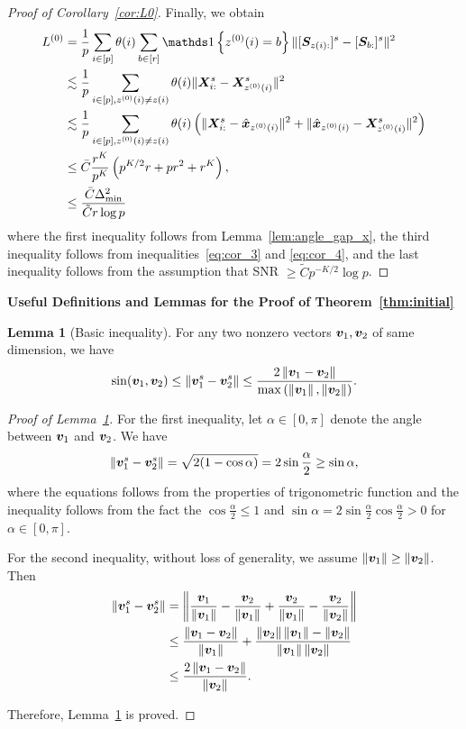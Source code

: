 \documentclass[lettersize,onecolumn,journal]{IEEEtran}
\theoremstyle{definition}
\newtheorem{lem}{Lemma}
\theoremstyle{definition}
\newcommand{\of}[1]{\left(#1\right)}
\newcommand{\offf}[1]{\left\{#1\right\}}
\begin{document}
\begin{proof} [Proof of Corollary~\ref{cor:L0}]
Finally, we obtain 
\begin{align}
     L^{(0)} &= \frac{1}{p}  \sum_{i \in [p]} \theta(i) \sum_{b \in [r]}  \ind \offf{ z^{(0)}(i) = b } \onormSize{}{ [ \mS_{  z(i):}  ]^s - [ \mS_{b:}  ]^s  }^2 \\
     & \lesssim \frac{1}{p}  \sum_{i \in [p], z^{(0)}(i) \neq z(i)} \theta(i)  \onormSize{}{ \mX_{i:}^s -  \mX_{z^{(0)}(i)}^s  }^2\\
     & \lesssim \frac{1}{p}  \sum_{i \in [p], z^{(0)}(i) \neq z(i)} \theta(i) \of{ \onormSize{}{\mX_{i:}^s - \hat \mx_{z^{(0)}(i)}}^2 + \onormSize{}{ \hat \mx_{z^{(0)}(i)} - \mX_{z^{(0)}(i)}^s  }^2 } \\
     & \leq \bar C \frac{r^{K}}{p^{K}} \of{ p^{K/2}r + pr^2 + r^K}, \\
     & \leq \frac{\bar C\Delta_{\min}^2}{ \tilde C r \log p}
\end{align}
where the first inequality follows from Lemma~\ref{lem:angle_gap_x}, the third inequality follows from inequalities~\eqref{eq:cor_3} and \eqref{eq:cor_4}, and the last inequality follows from the assumption that SNR $\geq \tilde C p^{-K/2} \log p$.
\end{proof}

{\bf Useful Definitions and Lemmas for the Proof of Theorem~\ref{thm:initial}} 
\begin{lem}[Basic inequality]\label{lem:norm_diff} For any two nonzero vectors $\bm{v}_1,\bm{v}_2$ of same dimension, we have 
\[
\sin(\bm{v}_1 , \bm{v}_2) \leq \left\lVert{\bm{v}_1^s}-{\bm{v}_2^s}\right\rVert\leq {2\left\lVert\bm{v}_1-\bm{v}_2\right\rVert\over \max\left(\left\lVert\bm{v}_1\right\rVert,\left\lVert\bm{v}_2\right\rVert\right)}.
\]
\end{lem}
\begin{proof}[Proof of Lemma~\ref{lem:norm_diff}]
For the first inequality, let $\alpha \in [0,\pi]$ denote the angle between $\bm{v}_1$ and $\bm{v}_2$. We have 
\begin{align}
     \left\lVert{\bm{v}_1^s}-{\bm{v}_2^s}\right\rVert = \sqrt{2(1 - \cos \alpha)} = 2 \sin \frac{\alpha}{2} \geq \sin \alpha,
\end{align}
where the equations follows from the properties of trigonometric function and the inequality follows from the fact the $\cos \frac{\alpha}{2} \leq 1$ and $\sin \alpha = 2 \sin \frac{\alpha}{2} \cos \frac{\alpha}{2} > 0$ for $\alpha \in [0, \pi]$. 

For the second inequality, without loss of generality, we assume $\left\lVert\bm{v}_1\right\rVert\geq \left\lVert\bm{v}_2\right\rVert$. Then
\begin{align}
\left\lVert{\bm{v}_1^s}-{\bm{v}_2^s}\right\rVert&=\left\lVert{\bm{v}_1\over \left\lVert\bm{v}_1\right\rVert}- {\bm{v}_2\over \left\lVert\bm{v}_1\right\rVert}+{\bm{v}_2\over \left\lVert\bm{v}_1\right\rVert}-{\bm{v}_2\over \left\lVert\bm{v}_2\right\rVert}\right\rVert\\
&\leq {\left\lVert\bm{v}_1-\bm{v}_2\right\rVert\over \left\lVert\bm{v}_1\right\rVert}+{\left\lVert\bm{v}_2\right\rVert\left\lVert\bm{v}_1\right\rVert-\left\lVert\bm{v}_2\right\rVert\over \left\lVert\bm{v}_1\right\rVert\left\lVert\bm{v}_2\right\rVert}\\
&\leq {2\left\lVert\bm{v}_1-\bm{v}_2\right\rVert\over \left\lVert\bm{v}_2\right\rVert}.
\end{align}

Therefore, Lemma~\ref{lem:norm_diff} is proved.
\end{proof}
\end{document}
